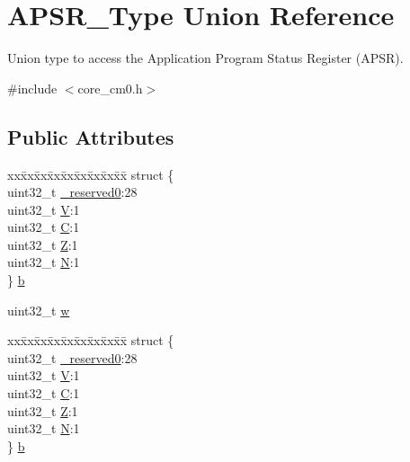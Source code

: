 \hypertarget{union_a_p_s_r___type}{\section{A\-P\-S\-R\-\_\-\-Type Union Reference}
\label{union_a_p_s_r___type}
}


Union type to access the Application Program Status Register (A\-P\-S\-R).  




{\ttfamily \#include $<$core\-\_\-cm0.\-h$>$}

\subsection*{Public Attributes}
\begin{DoxyCompactItemize}
\item 
\begin{tabbing}
xx\=xx\=xx\=xx\=xx\=xx\=xx\=xx\=xx\=\kill
struct \{\\
\>uint32\_t \hyperlink{union_a_p_s_r___type_afbce95646fd514c10aa85ec0a33db728}{\_reserved0}:28\\
\>uint32\_t \hyperlink{union_a_p_s_r___type_a8004d224aacb78ca37774c35f9156e7e}{V}:1\\
\>uint32\_t \hyperlink{union_a_p_s_r___type_a86e2c5b891ecef1ab55b1edac0da79a6}{C}:1\\
\>uint32\_t \hyperlink{union_a_p_s_r___type_a3b04d58738b66a28ff13f23d8b0ba7e5}{Z}:1\\
\>uint32\_t \hyperlink{union_a_p_s_r___type_a7e7bbba9b00b0bb3283dc07f1abe37e0}{N}:1\\
\} \hyperlink{union_a_p_s_r___type_a7dbc79a057ded4b11ca5323fc2d5ab14}{b}\\

\end{tabbing}\item 
uint32\-\_\-t \hyperlink{union_a_p_s_r___type_ae4c2ef8c9430d7b7bef5cbfbbaed3a94}{w}
\item 
\begin{tabbing}
xx\=xx\=xx\=xx\=xx\=xx\=xx\=xx\=xx\=\kill
struct \{\\
\>uint32\_t \hyperlink{union_a_p_s_r___type_afbce95646fd514c10aa85ec0a33db728}{\_reserved0}:28\\
\>uint32\_t \hyperlink{union_a_p_s_r___type_a8004d224aacb78ca37774c35f9156e7e}{V}:1\\
\>uint32\_t \hyperlink{union_a_p_s_r___type_a86e2c5b891ecef1ab55b1edac0da79a6}{C}:1\\
\>uint32\_t \hyperlink{union_a_p_s_r___type_a3b04d58738b66a28ff13f23d8b0ba7e5}{Z}:1\\
\>uint32\_t \hyperlink{union_a_p_s_r___type_a7e7bbba9b00b0bb3283dc07f1abe37e0}{N}:1\\
\} \hyperlink{union_a_p_s_r___type_a58bbe4a401dd92b53a0e9e2ab20486a9}{b}\\


\end{tabbing}
\end{DoxyCompactItemize}
